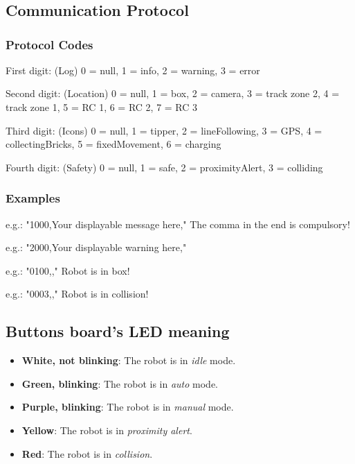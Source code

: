 \chapter{}

\section{Communication Protocol}\label{"apx:com_prot"}

	\subsection{Protocol Codes}

	First digit: (Log)
	0 = null,
	1 = info,
	2 = warning,
	3 = error

	Second digit: (Location)
	0 = null,
	1 = box,
	2 = camera,
	3 = track zone 2,
	4 = track zone 1,
	5 = RC 1,
	6 = RC 2,
	7 = RC 3

	Third digit: (Icons)
	0 = null,
	1 = tipper,
	2 = lineFollowing,
	3 = GPS,
	4 = collectingBricks,
	5 = fixedMovement,
	6 = charging

	Fourth digit: (Safety)
	0 = null,
	1 = safe,
	2 = proximityAlert,
	3 = colliding

	\subsection{Examples}

	e.g.: "1000,Your displayable message here,"  The comma in the end is compulsory!

	e.g.: "2000,Your displayable warning here," 

	e.g.: "0100,," Robot is in box!
	
	e.g.: "0003,," Robot is in collision!



\section{Buttons board's LED meaning} %
\label{sec:buttons_board_s_led_meaning}

\begin{itemize}
	\item \textbf{White, not blinking}: The robot is in \emph{idle} mode.
	\item \textbf{Green, blinking}: The robot is in \emph{auto} mode.
	\item \textbf{Purple, blinking}: The robot is in \emph{manual} mode.
	\item \textbf{Yellow}: The robot is in \emph{proximity alert}.
	\item \textbf{Red}: The robot is in \emph{collision}.
\end{itemize}

